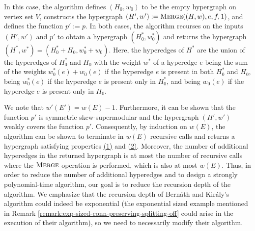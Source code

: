 \documentclass{article}
\newcommand{\knote}[1]{{\color{red}[{\tiny Karthik: \bf #1}]\marginpar{\color{red}*}}}
\newcommand{\merge}{\ensuremath{\textsc{Merge}}\xspace}
\begin{document}
In this case, the algorithm defines $(H_0, w_0)$ to be the empty hypergraph on vertex set $V$, constructs the hypergraph $(H', w'):=\merge((H, w), e, f, 1)$, and defines the function $p' := p$.
In both cases, the algorithm recurses on the inputs $(H',w')$ and $p'$ to obtain a hypergraph $(H^*_0, w^*_0)$ and returns the hypergraph $(H^*, w^*) = (H^*_0 + H_0, w^*_0 + w_0)$. 
Here, the hyperedges of $H^*$ are the union of the hyperedges of $H^*_0$ and $H_0$ with the weight $w^*$ of a hyperedge $e$ being the sum of the weights $w^*_0(e)+w_0(e)$ if the hyperedge $e$ is present in both $H^*_0$ and $H_0$, being $w^*_0(e)$ if the hyperedge $e$ is present only in $H^*_0$, and being $w_0(e)$ if the hyperedge $e$ is present only in $H_0$. 
\fi

 We note that $w'(E') = w(E) - 1$. Furthermore, it can be shown that the function $p'$ is symmetric skew-supermodular and the hypergraph $(H', w')$ weakly covers the function $p'$. Consequently, by induction on $w(E)$, the algorithm can be shown to terminate in $w(E)$ recursive calls and returns a hypergraph satisfying properties \hyperlink{WeakToStrong(1)}{(1)} and \hyperlink{WeakToStrong(2)}{(2)}. Moreover, the number of additional hyperedges in the returned hypergraph is at most the
number of recursive calls where the \merge operation is performed, which is also at most $w(E)$. 
Thus, in order
to reduce the number of additional hyperedges and to design a strongly polynomial-time algorithm, our goal is to
reduce the recursion depth of the algorithm. We emphasize that the recursion depth of Bern\'{a}th and Kir\'{a}ly's algorithm could indeed be exponential (the exponential sized example mentioned in Remark \ref{remark:exp-sized-conn-preserving-splitting-off} could arise in the execution of their algorithm), so we need to necessarily modify their algorithm. 
\end{document}
